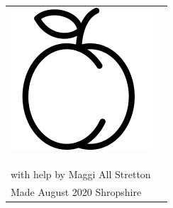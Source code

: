 \documentclass[12pt, a4paper]{letter}
\begin{document}
\newcommand\jamlabel{%
\rule{0mm}{10mm}
\begin{tabular}{@{}ll}%
\begin{minipage}{2.5cm}%
\includegraphics[scale=0.35]{jam-plum.png}
\end{minipage}%
&
\begin{minipage}{5cm}
  \textbf{\fontsize{18pt}{25pt}\selectfont Hani's Plum Jam}
  \\
  \textbf{}\hfill \\
  \scriptsize\\
  \strut\hfill \\
  with help by Maggi \hfill All Stretton\\
  Made August 2020 \hfill Shropshire
\end{minipage}
\end{tabular}
}%

\begin{labels}

%
{%
  \jamlabel
  
}%
\end{labels}
\end{document}
